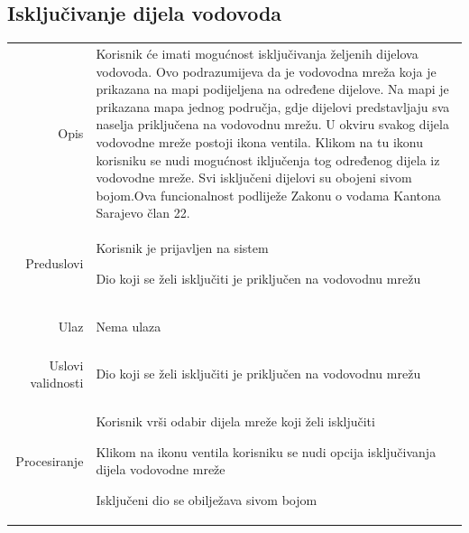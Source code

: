 \documentclass[]{report}
\begin{document}
\subsection{Isključivanje dijela vodovoda}
\begin{tabular}{rp{}}
Opis & 
\hspace{12pt} Korisnik će imati mogućnost isključivanja željenih dijelova vodovoda. Ovo podrazumijeva da je vodovodna mreža koja je prikazana na mapi podijeljena na određene dijelove. Na mapi je prikazana mapa jednog područja, gdje dijelovi predstavljaju sva naselja priključena na vodovodnu mrežu. U okviru svakog dijela vodovodne mreže postoji ikona ventila. Klikom na tu ikonu korisniku se nudi mogućnost iključenja tog određenog dijela iz vodovodne mreže. Svi isključeni dijelovi su obojeni sivom bojom.Ova funcionalnost podliježe Zakonu o vodama Kantona Sarajevo član 22.
\\
Preduslovi & 
\begin{compactitem}
    \item Korisnik je prijavljen na sistem
    \item Dio koji se želi isključiti je priključen na vodovodnu mrežu
\end{compactitem}

\\
Ulaz & 

\begin{compactitem} 
      \item Nema ulaza
    \end{compactitem}

\\
Uslovi validnosti &

\begin{compactitem} 
   \item  Dio koji se želi isključiti je priključen na vodovodnu mrežu
\end{compactitem}

\\
Procesiranje &

\begin{compactitem} 
    \item Korisnik vrši odabir dijela mreže koji želi isključiti
    \item Klikom na ikonu ventila korisniku se nudi opcija isključivanja dijela vodovodne mreže
    \item Isključeni dio se obilježava sivom bojom

\end{compactitem}


\end{tabular}
\end{document}
